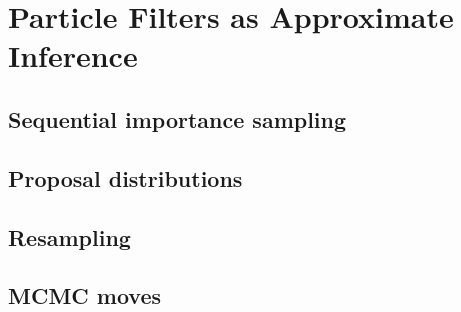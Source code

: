 \section{Particle Filters as Approximate Inference}\label{sec:particle-filters}

\subsection{Sequential importance sampling}

\subsection{Proposal distributions}

\subsection{Resampling}

\subsection{MCMC moves}

